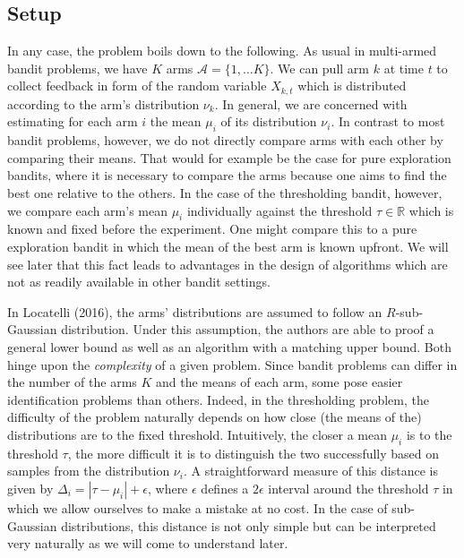 \documentclass[12pt,]{article}
\begin{document}
\subsection{Setup}\label{setup}

In any case, the problem boils down to the following. As usual in
multi-armed bandit problems, we have \(K\) arms
\(\mathcal{A} = \{1, \dots K\}\). We can pull arm \(k\) at time \(t\) to
collect feedback in form of the random variable \(X_{k,t}\) which is
distributed according to the arm's distribution \(\nu_k\). In general,
we are concerned with estimating for each arm \(i\) the mean \(\mu_i\)
of its distribution \(\nu_i\). In contrast to most bandit problems,
however, we do not directly compare arms with each other by comparing
their means. That would for example be the case for pure exploration
bandits, where it is necessary to compare the arms because one aims to
find the best one relative to the others. In the case of the
thresholding bandit, however, we compare each arm's mean \(\mu_i\)
individually against the threshold \(\tau \in \mathbb{R}\) which is
known and fixed before the experiment. One might compare this to a pure
exploration bandit in which the mean of the best arm is known upfront.
We will see later that this fact leads to advantages in the design of
algorithms which are not as readily available in other bandit settings.

In Locatelli (2016), the arms' distributions are assumed to follow an
\(R\)-sub-Gaussian distribution. Under this assumption, the authors are
able to proof a general lower bound as well as an algorithm with a
matching upper bound. Both hinge upon the \emph{complexity} of a given
problem. Since bandit problems can differ in the number of the arms
\(K\) and the means of each arm, some pose easier identification
problems than others. Indeed, in the thresholding problem, the
difficulty of the problem naturally depends on how close (the means of
the) distributions are to the fixed threshold. Intuitively, the closer a
mean \(\mu_i\) is to the threshold \(\tau\), the more difficult it is to
distinguish the two successfully based on samples from the distribution
\(\nu_i\). A straightforward measure of this distance is given by
\(\Delta_i = |\tau - \mu_i| + \epsilon\), where \(\epsilon\) defines a
\(2\epsilon\) interval around the threshold \(\tau\) in which we allow
ourselves to make a mistake at no cost. In the case of sub-Gaussian
distributions, this distance is not only simple but can be interpreted
very naturally as we will come to understand later.
\end{document}
